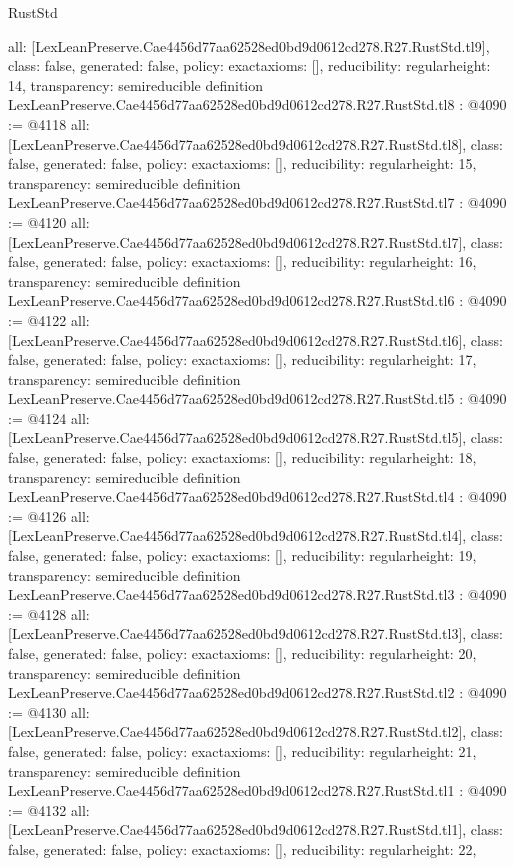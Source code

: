 \begin{lexlean}{RustStd}
\begin{coremodule}
{  all: [LexLeanPreserve.Cae4456d77aa62528ed0bd9d0612cd278.R27.RustStd.tl9],
  class: false,
  generated: false,
  policy: exact{axioms: []},
  reducibility: regular{height: 14},
  transparency: semireducible
}
definition LexLeanPreserve.Cae4456d77aa62528ed0bd9d0612cd278.R27.RustStd.tl8 : @4090 := @4118 {
  all: [LexLeanPreserve.Cae4456d77aa62528ed0bd9d0612cd278.R27.RustStd.tl8],
  class: false,
  generated: false,
  policy: exact{axioms: []},
  reducibility: regular{height: 15},
  transparency: semireducible
}
definition LexLeanPreserve.Cae4456d77aa62528ed0bd9d0612cd278.R27.RustStd.tl7 : @4090 := @4120 {
  all: [LexLeanPreserve.Cae4456d77aa62528ed0bd9d0612cd278.R27.RustStd.tl7],
  class: false,
  generated: false,
  policy: exact{axioms: []},
  reducibility: regular{height: 16},
  transparency: semireducible
}
definition LexLeanPreserve.Cae4456d77aa62528ed0bd9d0612cd278.R27.RustStd.tl6 : @4090 := @4122 {
  all: [LexLeanPreserve.Cae4456d77aa62528ed0bd9d0612cd278.R27.RustStd.tl6],
  class: false,
  generated: false,
  policy: exact{axioms: []},
  reducibility: regular{height: 17},
  transparency: semireducible
}
definition LexLeanPreserve.Cae4456d77aa62528ed0bd9d0612cd278.R27.RustStd.tl5 : @4090 := @4124 {
  all: [LexLeanPreserve.Cae4456d77aa62528ed0bd9d0612cd278.R27.RustStd.tl5],
  class: false,
  generated: false,
  policy: exact{axioms: []},
  reducibility: regular{height: 18},
  transparency: semireducible
}
definition LexLeanPreserve.Cae4456d77aa62528ed0bd9d0612cd278.R27.RustStd.tl4 : @4090 := @4126 {
  all: [LexLeanPreserve.Cae4456d77aa62528ed0bd9d0612cd278.R27.RustStd.tl4],
  class: false,
  generated: false,
  policy: exact{axioms: []},
  reducibility: regular{height: 19},
  transparency: semireducible
}
definition LexLeanPreserve.Cae4456d77aa62528ed0bd9d0612cd278.R27.RustStd.tl3 : @4090 := @4128 {
  all: [LexLeanPreserve.Cae4456d77aa62528ed0bd9d0612cd278.R27.RustStd.tl3],
  class: false,
  generated: false,
  policy: exact{axioms: []},
  reducibility: regular{height: 20},
  transparency: semireducible
}
definition LexLeanPreserve.Cae4456d77aa62528ed0bd9d0612cd278.R27.RustStd.tl2 : @4090 := @4130 {
  all: [LexLeanPreserve.Cae4456d77aa62528ed0bd9d0612cd278.R27.RustStd.tl2],
  class: false,
  generated: false,
  policy: exact{axioms: []},
  reducibility: regular{height: 21},
  transparency: semireducible
}
definition LexLeanPreserve.Cae4456d77aa62528ed0bd9d0612cd278.R27.RustStd.tl1 : @4090 := @4132 {
  all: [LexLeanPreserve.Cae4456d77aa62528ed0bd9d0612cd278.R27.RustStd.tl1],
  class: false,
  generated: false,
  policy: exact{axioms: []},
  reducibility: regular{height: 22},
}
\end{coremodule}
\end{lexlean}
